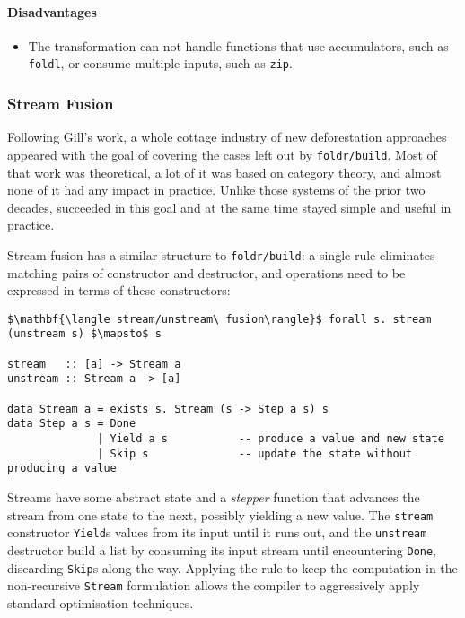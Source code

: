 \paragraph{Disadvantages}
\begin{itemize}
    \item The transformation can not handle functions that use accumulators,
        such as \texttt{foldl}, or consume multiple inputs, such as
        \texttt{zip}.
\end{itemize}


\subsubsection{Stream Fusion}

Following Gill's work, a whole cottage industry of new deforestation approaches
appeared with the goal of covering the cases left out by \texttt{foldr/build}.
Most of that work was theoretical, a lot of it was based on category theory, and
almost none of it had any impact in practice. Unlike those systems of the prior
two decades,  \cite{Coutts:2007} succeeded in this goal and
at the same time stayed simple and useful in practice.

Stream fusion has a similar structure to \texttt{foldr/build}: a single rule
eliminates matching pairs of constructor and destructor, and operations need to
be expressed in terms of these constructors:
%
\begin{lstlisting}[style=Haskell,numbers=none,mathescape,caption={The \emph{stream fusion} transformation}]
$\mathbf{\langle stream/unstream\ fusion\rangle}$ forall s. stream (unstream s) $\mapsto$ s

stream   :: [a] -> Stream a
unstream :: Stream a -> [a]

data Stream a = exists s. Stream (s -> Step a s) s
data Step a s = Done
              | Yield a s           -- produce a value and new state
              | Skip s              -- update the state without producing a value
\end{lstlisting}

Streams have some abstract state and a \emph{stepper} function that advances the
stream from one state to the next, possibly yielding a new value. The
\texttt{stream} constructor \texttt{Yield}s values from its input until it runs
out, and the \texttt{unstream} destructor build a list by consuming its input
stream until encountering \texttt{Done}, discarding \texttt{Skip}s along the
way. Applying the rule to keep the computation in the non-recursive
\texttt{Stream} formulation allows the compiler to aggressively apply standard
optimisation techniques.

